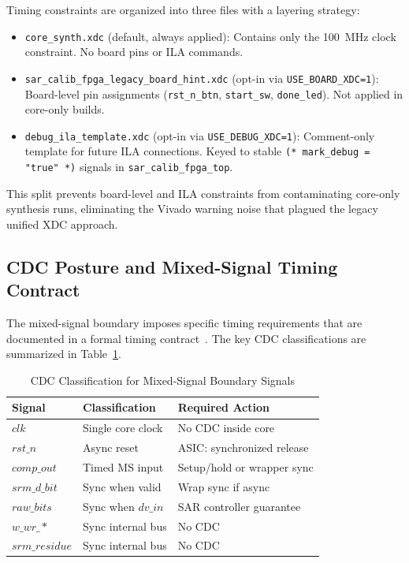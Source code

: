 \documentclass[journal]{IEEEtran}
\begin{document}
Timing constraints are organized into three files with a layering strategy:

\begin{itemize}
    \item \texttt{core\_synth.xdc} (default, always applied): Contains only
          the 100~MHz clock constraint. No board pins or ILA commands.
    \item \texttt{sar\_calib\_fpga\_legacy\_board\_hint.xdc} (opt-in via
          \texttt{USE\_BOARD\_XDC=1}): Board-level pin assignments
          (\texttt{rst\_n\_btn}, \texttt{start\_sw}, \texttt{done\_led}).
          Not applied in core-only builds.
    \item \texttt{debug\_ila\_template.xdc} (opt-in via
          \texttt{USE\_DEBUG\_XDC=1}): Comment-only template for future ILA
          connections. Keyed to stable \texttt{(* mark\_debug = "true" *)}
          signals in \texttt{sar\_calib\_fpga\_top}.
\end{itemize}

This split prevents board-level and ILA constraints from contaminating
core-only synthesis runs, eliminating the Vivado warning noise that plagued
the legacy unified XDC approach.

\subsection{CDC Posture and Mixed-Signal Timing Contract}

The mixed-signal boundary imposes specific timing requirements that are
documented in a formal timing contract~\cite{timing_contract}. The key CDC
classifications are summarized in Table~\ref{tab:cdc}.

\begin{table}[!t]
\centering
\caption{CDC Classification for Mixed-Signal Boundary Signals}
\label{tab:cdc}
\footnotesize
\setlength{\tabcolsep}{3pt}
\begin{tabular}{p{}p{}p{}}
\toprule
Signal & Classification & Required Action \\
\midrule
$clk$ & Single core clock & No CDC inside core \\
$rst\_n$ & Async reset & ASIC: synchronized release \\
$comp\_out$ & Timed MS input & Setup/hold or wrapper sync \\
$srm\_d\_bit$ & Sync when valid & Wrap sync if async \\
$raw\_bits$ & Sync when $dv\_in$ & SAR controller guarantee \\
$w\_wr\_*$ & Sync internal bus & No CDC \\
$srm\_residue$ & Sync internal bus & No CDC \\
\bottomrule
\end{tabular}
\end{table}
\end{document}
